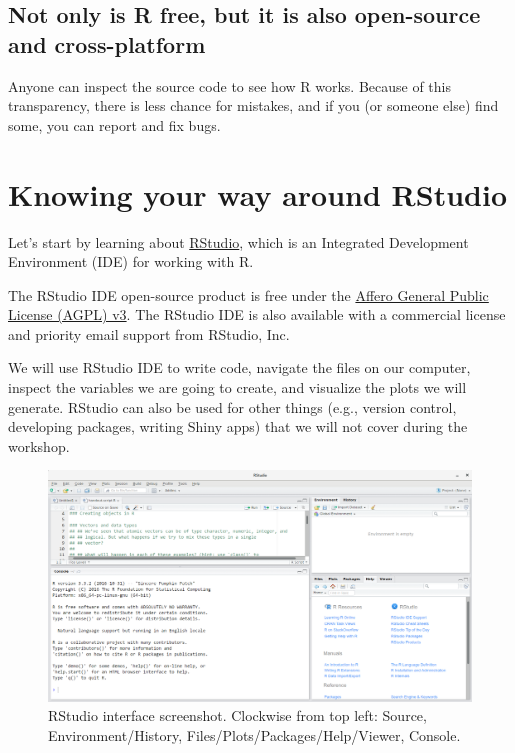\documentclass[]{book}
\begin{document}
\subsection{Not only is R free, but it is also open-source and
cross-platform}\label{not-only-is-r-free-but-it-is-also-open-source-and-cross-platform}

Anyone can inspect the source code to see how R works. Because of this
transparency, there is less chance for mistakes, and if you (or someone
else) find some, you can report and fix bugs.

\section{Knowing your way around
RStudio}\label{knowing-your-way-around-rstudio}

Let's start by learning about \href{https://www.rstudio.com/}{RStudio},
which is an Integrated Development Environment (IDE) for working with R.

The RStudio IDE open-source product is free under the
\href{https://www.gnu.org/licenses/agpl-3.0.en.html}{Affero General
Public License (AGPL) v3}. The RStudio IDE is also available with a
commercial license and priority email support from RStudio, Inc.

We will use RStudio IDE to write code, navigate the files on our
computer, inspect the variables we are going to create, and visualize
the plots we will generate. RStudio can also be used for other things
(e.g., version control, developing packages, writing Shiny apps) that we
will not cover during the workshop.

\begin{figure}
\centering
\includegraphics{img/rstudio-screenshot.png}
\caption{RStudio interface screenshot. Clockwise from top left: Source,
Environment/History, Files/Plots/Packages/Help/Viewer, Console.}
\end{figure}
\end{document}

